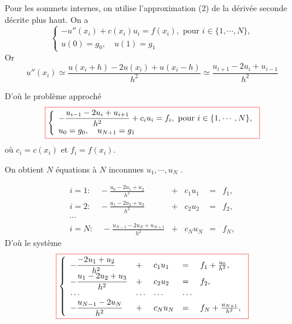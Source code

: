 \documentclass{beamer}
\newcommand{\myredbox}[1]{\fcolorbox{red}{white}{$\displaystyle#1$}}
\begin{document}
 
 \begin{frame}

 Pour les sommets internes, on utilise l'approximation (2) de la dérivée seconde décrite plus haut. On a
 \begin{equation}
\left\{\begin{array}{l}
-u''(x_i)+c(x_i)u_i = f(x_i), \mbox { pour } i\in\{1, \cdots , N\},\\
u(0)=g_0,\quad u(1)=g_1
\end{array}
\right.
\end{equation}
Or
\[u''(x_i)\simeq \frac{u(x_i+h)-2u(x_i)+u(x_i-h)}{h^2}\simeq \frac{u_{i+1}-2u_i+u_{i-1}}{h^2}\] 


D'où le problème approché
\begin{equation}
\myredbox{\left\{\begin{array}{l}
-{\displaystyle \frac{u_{i-1}-2u_i+u_{i+1}}{h^2}+c_iu_i }= f_i, \mbox { pour } i\in\{1, \cdots , N\},\\
u_0=g_0,\quad u_{N+1}=g_1
\end{array}
\right.}
\end{equation}
où $c_i=c(x_i)$ et $f_i=f(x_i)$.
 \end{frame}
 
\begin{frame} 
On obtient $N$ équations à $N$ inconnues $u_1, \cdots , u_N$ . 

\[\begin{array}{lllll}
i=1:\quad -{\displaystyle \frac{u_{0}-2u_1+u_{2}}{h^2} }&+&c_1u_1&=& f_1, \\
i=2:\quad -{\displaystyle \frac{u_{1}-2u_2+u_{3}}{h^2} }&+&c_2u_2 &= &f_2, \\
\cdots&&&&\\
i=N:\quad -{\displaystyle \frac{u_{N-1}-2u_{N}+u_{N+1}}{h^2} }&+&c_{N}u_{N} &=& f_{N},

\end{array}
\]
D'où le système
\[\myredbox{\left\{\begin{array}{lllll}
-{\displaystyle \frac{-2u_1+u_{2}}{h^2}}&+&c_1u_1 &= &f_1+\frac{u_{0}}{h^2}, \\
-{\displaystyle \frac{u_{1}-2u_2+u_{3}}{h^2}}&+&c_2u_2 &=& f_2, \\
\cdots&\cdots&\cdots&\cdots\\
-{\displaystyle \frac{u_{N-1}-2u_{N}}{h^2}}&+&c_{N}u_{N} &=& f_{N}+\frac{u_{N+1}}{h^2},

\end{array}\right.}
\]


 \end{frame}
 
\end{document}
